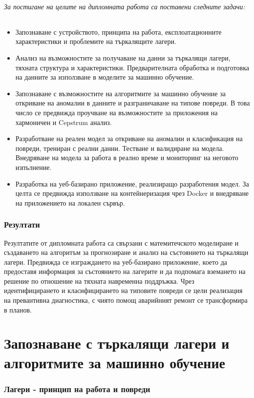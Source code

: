 \documentclass{article}
\begin{document}
\paragraph{За постигане на целите на дипломната работа са поставени следните задачи:}
\begin{itemize}
    \item Запознаване с устройството, принципа на работа, експлоатационните характеристики и проблемите на търкалящите лагери.
    \item Анализ на възможностите за получаване на данни за търкалящи лагери, тяхната структура и характеристики. Предварителната обработка и подготовка на данните за използване в моделите за машинно обучение.
    \item Запознаване с възможностите на алгоритмите за машинно обучение за откриване на аномалии в данните и разграничаване на типове повреди. В това число се предвижда проучване на възможностите за приложения на хармоничен и Cepstrum анализ.
    \item Разработване на реален модел за откриване на аномалии и класификация на повреди, трениран с реални данни. Тестване и валидиране на модела. Внедряване на модела за работа в реално време и мониторинг на неговото изпълнение.
    \item Разработка на уеб-базирано приложение, реализиращо разработения модел. За целта се предвижда използване на контейнеризация чрез Docker и внедряване на приложението на локален сървър.
\end{itemize}
\section{Резултати}
Резултатите от дипломната работа са свързани с матемитечското моделиране и създаването на алгоритъм за прогнозиране и анализ на състоянието на търкалящи лагери. Предвижда се изграждането на уеб-базирано приложение, което да предоставя информация за състоянието на лагерите и да подпомага вземането на решение по отношение на тяхната навременна поддръжка. Чрез идентифицирането и класифицирането на типовите повреди се цели реализация на превантивна диагностика, с чиято помощ аварийният ремонт се трансформира в планов.
\newpage
\part{Запознаване с търкалящи лагери и алгоритмите за машинно обучение}
\setcounter{section}{0}
\section{Лагери - принцип на работа и повреди}
\end{document}
